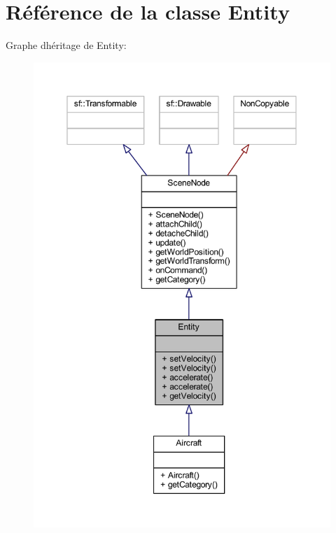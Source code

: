 \hypertarget{class_entity}{}\section{Référence de la classe Entity}
\label{class_entity}


Graphe d\textquotesingle{}héritage de Entity\+:\nopagebreak
\begin{figure}[H]
\begin{center}
\leavevmode
\includegraphics[width=350pt]{class_entity__inherit__graph}
\end{center}
\end{figure}


